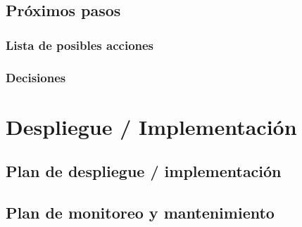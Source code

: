 \documentclass[11pt,a4paper]{tesis}
\begin{document}
\section{Próximos pasos}

\subsection{Lista de posibles acciones}

\subsection{Decisiones}


\chapter{Despliegue / Implementación}

\section{Plan de despliegue / implementación}

\section{Plan de monitoreo y mantenimiento}

\end{document}
